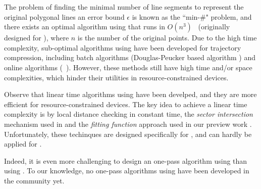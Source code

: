 The problem of finding the minimal number of line segments to represent the original polygonal lines \wrt an error bound $\epsilon$ is known as the ``min-\#" problem\cite{Imai:Optimal,Chan:Optimal}, and there exists an optimal \lsa algorithm using \sed that runs in $O(n^3)$~\cite{Imai:Optimal} (originally designed for \ped ),  where $n$ is the number of the original points.
Due to the high time complexity, sub-optimal \lsa algorithms using \sed have been developed for trajectory compression, including batch algorithms (\eg Douglas-Peucker based algorithm \dpsed \cite{Meratnia:Spatiotemporal}) and online algorithms (\eg\ \squishe \cite{Muckell:Compression}).
However, these methods still have high time and/or space complexities, which hinder their utilities in resource-constrained devices. %


Observe that linear time \lsa algorithms using \ped \cite{Williams:Longest, Sklansky:Cone, Dunham:Cone, Zhao:Sleeve, Lin:Operb} have been develped, and they are more efficient for resource-constrained devices.
%
The key idea to achieve a linear time complexity is by local distance checking in constant time, \eg the \textit{sector intersection} mechanism used in \cite{Williams:Longest, Sklansky:Cone, Dunham:Cone, Zhao:Sleeve} and the \textit{fitting function} approach used in our preview work \cite {Lin:Operb}.
Unfortunately, these techinques are designed specifically for \ped, and can hardly be applied for \sed.


Indeed, it is even more challenging to design an one-pass \lsa algorithm using \sed than using \ped.
To our knowledge,  no one-pass \lsa algorithms using \sed have been developed in the community yet.



